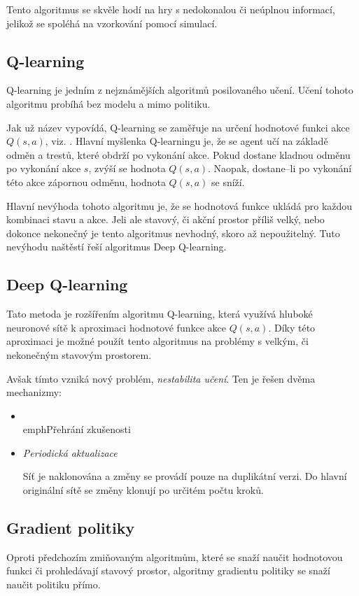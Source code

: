 Tento algoritmus se skvěle hodí na hry s nedokonalou či neúplnou informací, jelikož se spoléhá na vzorkování pomocí simulací.

\subsection{Q-learning}

Q-learning je jedním z nejznámějších algoritmů posilovaného učení.
Učení tohoto algoritmu probíhá bez modelu a mimo politiku.

Jak už název vypovídá, Q-learning se zaměřuje na určení hodnotové funkci akce $Q(s, a)$, viz. .
Hlavní myšlenka Q-learningu je, že se agent učí na základě odměn a trestů, které obdrží po vykonání akce.
Pokud dostane kladnou odměnu po vykonání akce $s$, zvýší se hodnota $Q(s, a)$.
Naopak, dostane--li po vykonání této akce zápornou odměnu, hodnota $Q(s, a)$ se sníží.

Hlavní nevýhoda tohoto algoritmu je, že se hodnotová funkce ukládá pro každou kombinaci stavu a akce.
Jeli ale stavový, či akční prostor příliš velký, nebo dokonce nekonečný je tento algoritmus nevhodný, skoro až nepoužitelný.
Tuto nevýhodu naštěstí řeší algoritmus Deep Q-learning.

\subsection{Deep Q-learning}

Tato metoda je rozšířením algoritmu Q-learning, která využívá hluboké neuronové sítě k aproximaci hodnotové funkce akce $Q(s, a)$.
Díky této aproximaci je možné použít tento algoritmus na problémy s velkým, či nekonečným stavovým prostorem.

Avšak tímto vzniká nový problém, \emph{nestabilita učení}.
Ten je řešen dvěma mechanizmy:

\begin{itemize}
  \item \\emph{Přehrání zkušenosti}
  

  \item \emph{Periodická aktualizace}

  Síť je naklonována a změny se provádí pouze na duplikátní verzi.
  Do hlavní originální sítě se změny klonují po určitém počtu kroků.


\end{itemize}

\subsection{Gradient politiky}
Oproti předchozím zmiňovaným algoritmům, které se snaží naučit hodnotovou funkci či prohledávají stavový prostor, algoritmy gradientu politiky se snaží naučit politiku přímo.

